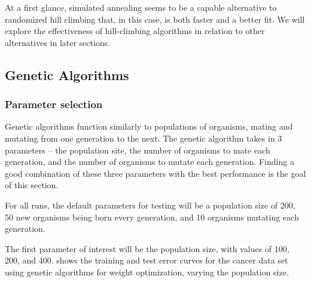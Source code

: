 \documentclass{article}
\begin{document}
        At a first glance, simulated annealing seems to be a capable alternative to randomized hill climbing that, in this case, is both faster and a better fit. We will explore the effectiveness of hill-climbing algorithms in relation to other alternatives in later sections.

    \subsection{Genetic Algorithms}

      \subsubsection{Parameter selection}
        Genetic algorithms function similarly to populations of organisms, mating and mutating from one generation to the next. The genetic algorithm takes in 3 parameters -- the population site, the number of organisms to mate each generation, and the number of organisms to mutate each generation. Finding a good combination of these three parameters with the best performance is the goal of this section.

        For all runs, the default parameters for testing will be a population size of 200, 50 new organisms being born every generation, and 10 organisms mutating each generation.

        The first parameter of interest will be the population size, with values of 100, 200, and 400.  shows the training and test error curves for the cancer data set using genetic algorithms for weight optimization, varying the population size.
\end{document}
